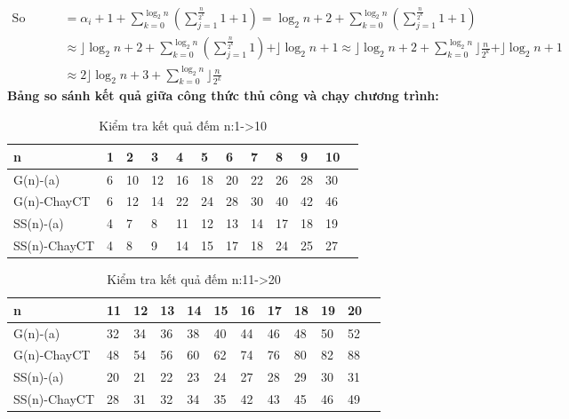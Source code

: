 \documentclass[10pt,a4paper]{article}
\begin{document}
    \begin{align*}
        \text{So sánh(n)}
            & = \alpha_i +1 + \sum_{k=0}^{\log_2 n}{(\sum_{j=1}^{\frac{n}{2^k}}{1} + 1)} = \log_2 n + 2 + \sum_{k=0}^{\log_2 n}{(\sum_{j=1}^{\frac{n}{2^k}}{1} + 1)} \\
            & \approx \rfloor\log_2 n + 2 + \sum_{k=0}^{\log_2 n}{(\sum_{j=1}^{\frac{n}{2^k}}{1})} + \rfloor\log_2 n + 1 \approx \rfloor\log_2 n + 2 + \sum_{k=0}^{\log_2 n}{\rfloor\frac{n}{2^k}} + \rfloor\log_2 n + 1 \\
            & \approx 2\rfloor\log_2 n + 3 +  \sum_{k=0}^{\log_2 n}{\rfloor\frac{n}{2^k}}
    \end{align*}
    \newpage
    \centering\textbf{Bảng so sánh kết quả giữa công thức thủ công và chạy chương trình: }
    \fontsize{12}{14}\selectfont
    \renewcommand{\arraystretch}{1.5}
    \setlength{\arrayrulewidth}{1pt}
    \begin{table}[h]
        \centering
        \begin{tabular}[c]
        {|p{2.5cm}|p{1cm}|p{1cm}|p{1cm}|p{1cm}|p{1cm}|p{1cm}|p{1cm}|p{1cm}|p{1cm}|p{1cm}|p{1cm}|}\hline
            \rowcolor[rgb]{0, .60, .800}n&1&2&3&4&5&6&7&8&9&10\tabularnewline\hline
            G(n)-(a)  & 6 & 10 & 12 & 16 & 18 & 20 & 22 & 26 & 28 & 30\tabularnewline\hline
            \rowcolor[rgb]{0, .60, .800}G(n)-ChayCT & 6 & 12 & 14 & 22 & 24 & 28 & 30 & 40 & 42 & 46 \tabularnewline\hline
            SS(n)-(a) & 4 & 7 & 8 & 11 & 12 & 13 & 14 & 17 & 18 & 19 \tabularnewline\hline
            \rowcolor[rgb]{0, .60, .800}SS(n)-ChayCT & 4 & 8 & 9 & 14 & 15 & 17 & 18 & 24 & 25 & 27 \tabularnewline
        \end{tabular}
        \caption{Kiểm tra kết quả đếm n:1->10}
    \end{table}
    \begin{table}[H]
        \centering
        \begin{tabular}[c]{|p{2.5cm}|p{1cm}|p{1cm}|p{1cm}|p{1cm}|p{1cm}|p{1cm}|p{1cm}|p{1cm}|p{1cm}|p{1cm}|p{1cm}|}\hline
         \rowcolor[rgb]{0, .60, .800}n&11&12&13&14&15&16&17&18&19&20 \tabularnewline\hline
        G(n)-(a)  & 32 & 34 & 36 & 38 & 40 & 44 & 46 & 48 & 50 & 52 \tabularnewline\hline
        \rowcolor[rgb]{0, .60, .800}G(n)-ChayCT & 48 & 54 & 56 & 60 & 62 & 74 & 76 & 80 & 82 &88 \tabularnewline\hline
        SS(n)-(a) & 20 & 21 & 22 & 23 & 24 & 27 & 28 & 29 & 30 & 31 \tabularnewline\hline
        \rowcolor[rgb]{0, .60, .800}SS(n)-ChayCT & 28 & 31 & 32 & 34 & 35 & 42 & 43 & 45 & 46 & 49 \tabularnewline
        \end{tabular}
        \caption{Kiểm tra kết quả đếm n:11->20}
    \end{table}
\end{document}
